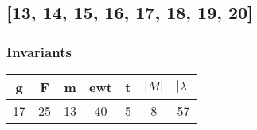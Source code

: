 \documentclass[a4paper]{article}
\begin{document}
\newpage\subsection{[13, 14, 15, 16, 17, 18, 19, 20]}
\noindent\begin{minipage}{0.6\textwidth}
\subsubsection*{Invariants}
\centering
\begin{tabular}{|c|c|c|c|c|c|c|}
\toprule
g & F & m & ewt & t & \(|M|\) & \(|\lambda|\) \\
\midrule
17 & 25 & 13 & 40 & 5 & 8 & 57 \\
\bottomrule
\end{tabular}
\end{minipage}%
\end{document}
